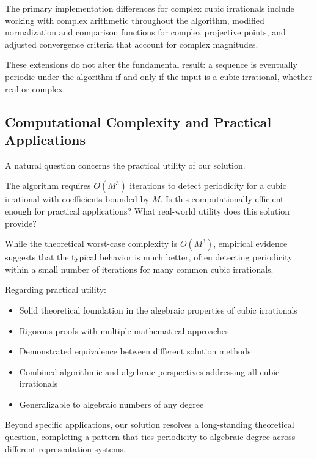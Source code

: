 The primary implementation differences for complex cubic irrationals include working with complex arithmetic throughout the algorithm, modified normalization and comparison functions for complex projective points, and adjusted convergence criteria that account for complex magnitudes.

These extensions do not alter the fundamental result: a sequence is eventually periodic under the \HAPD{} algorithm if and only if the input is a cubic irrational, whether real or complex.

\subsection{Computational Complexity and Practical Applications}

A natural question concerns the practical utility of our solution.

\begin{objection}
The \HAPD{} algorithm requires $O(M^3)$ iterations to detect periodicity for a cubic irrational with coefficients bounded by $M$. Is this computationally efficient enough for practical applications? What real-world utility does this solution provide?
\end{objection}

\begin{response}
While the theoretical worst-case complexity is $O(M^3)$, empirical evidence suggests that the typical behavior is much better, often detecting periodicity within a small number of iterations for many common cubic irrationals.

Regarding practical utility:
\begin{itemize}
    \item Solid theoretical foundation in the algebraic properties of cubic irrationals
    \item Rigorous proofs with multiple mathematical approaches
    \item Demonstrated equivalence between different solution methods
    \item Combined algorithmic and algebraic perspectives addressing all cubic irrationals
    \item Generalizable to algebraic numbers of any degree
\end{itemize}

Beyond specific applications, our solution resolves a long-standing theoretical question, completing a pattern that ties periodicity to algebraic degree across different representation systems.
\end{response}

